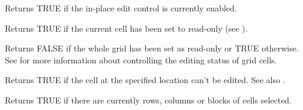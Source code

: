 \label{wxgridiscelleditcontrolenabled}


Returns TRUE if the in-place edit control is currently enabled.

\label{wxgridiscurrentcellreadonly}


Returns TRUE if the current cell has been set to read-only
(see ).

\label{wxgridiseditable}


Returns FALSE if the whole grid has been set as read-only or TRUE otherwise.
See  for more information about
controlling the editing status of grid cells.

\label{wxgridisreadonly}


Returns TRUE if the cell at the specified location can't be edited.
See also .

\label{wxgridisselection}


Returns TRUE if there are currently rows, columns or blocks of cells selected.

\label{wxgridisvisible}


